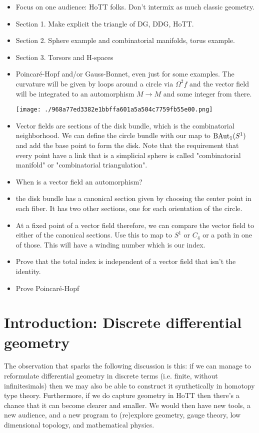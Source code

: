 \begin{itemize}
\item
  Focus on one audience: HoTT folks. Don't intermix as much classic
  geometry.
\item
  Section 1. Make explicit the triangle of DG, DDG, HoTT.
\item
  Section 2. Sphere example and combinatorial manifolds, torus example.
\item
  Section 3. Torsors and H-spaces
\item
  Poincaré-Hopf and/or Gauss-Bonnet, even just for some examples. The
  curvature will be given by loops around a circle via \(\Omega^2 f\)
  and the vector field will be integrated to an automorphism \(M\to M\)
  and some integer from there.

  \texttt{[image: ./968a77ed3382e1bbffa601a5a504c7759fb55e00.png]}
\item
  Vector fields are sections of the disk bundle, which is the
  combinatorial neighborhood. We can define the circle bundle with our
  map to \(\mathrm{BAut}_1(S^1)\) and add the base point to form the disk. Note that
  the requirement that every point have a link that is a simplicial
  sphere is called "combinatorial manifold" or "combinatorial
  triangulation".
\item
  When is a vector field an automorphism?
\item
  the disk bundle has a canonical section given by choosing the center
  point in each fiber. It has two other sections, one for each
  orientation of the circle.
\item
  At a fixed point of a vector field therefore, we can compare the
  vector field to either of the canonical sections. Use this to map to
  \(S^1\) or \(C_4\) or a path in one of those. This will have a winding
  number which is our index.
\item
  Prove that the total index is independent of a vector field that isn't
  the identity.
\item
  Prove Poincaré-Hopf
\end{itemize}

\section{Introduction: Discrete differential
geometry}\label{introduction-discrete-differential-geometry}

The observation that sparks the following discussion is this: if we can
manage to reformulate differential geometry in discrete terms (i.e.
finite, without infinitesimals) then we may also be able to construct it
synthetically in homotopy type theory. Furthermore, if we do capture
geometry in HoTT then there's a chance that it can become clearer and
smaller. We would then have new tools, a new audience, and a new program
to (re)explore geometry, gauge theory, low dimensional topology, and
mathematical physics.

